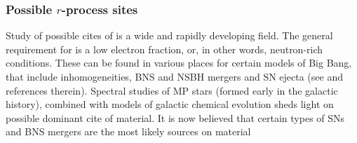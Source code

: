 

\subsubsection{Possible $r$-process sites}

Study of possible cites of \rproc{} is a wide and rapidly developing field. The general requirement 
for \rproc{} is a low electron fraction, or, in other words, neutron-rich conditions. These can be 
found in various places for certain models of Big Bang, that include inhomogeneities, 
\ac{BNS} and \ac{NSBH} mergers and \ac{SN} ejecta (see \citet{Mathews:1990} and references therein). 
%
Spectral studies of \ac{MP} stars (formed early in the galactic history), combined with models of 
galactic chemical evolution sheds light on possible dominant cite of \rproc{} material. 
It is now believed that certain types of \acp{SN} and \ac{BNS} mergers are the most likely 
sources on \rproc{} material \citep{Mathews:1990,Thielemann:2011,Siegel:2019mlp} %



